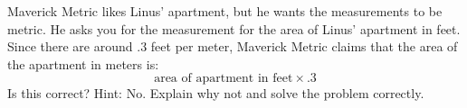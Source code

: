 \documentclass[handout,nooutcomes,noauthor]{ximera}
\begin{document}





\begin{problem}
Maverick Metric likes Linus' apartment, but he wants the measurements
to be metric. He asks you for the measurement for the area of Linus'
apartment in feet. Since there are around $.3$ feet per meter,
Maverick Metric claims that the area of the apartment in meters is:
\[
\text{area of apartment in feet} \times .3 
\]
Is this correct? Hint: No. Explain why not and solve the problem
correctly.
\end{problem}
\end{document}
